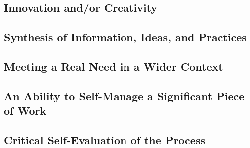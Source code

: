 \documentclass[12pt]{article}
\begin{document}
\subsection{Innovation and/or Creativity}

\subsection{Synthesis of Information, Ideas, and Practices}

\subsection{Meeting a Real Need in a Wider Context}

\subsection{An Ability to Self-Manage a Significant Piece of Work}

\subsection{Critical Self-Evaluation of the Process}


\printbibliography
\printglossaries
\end{document}
